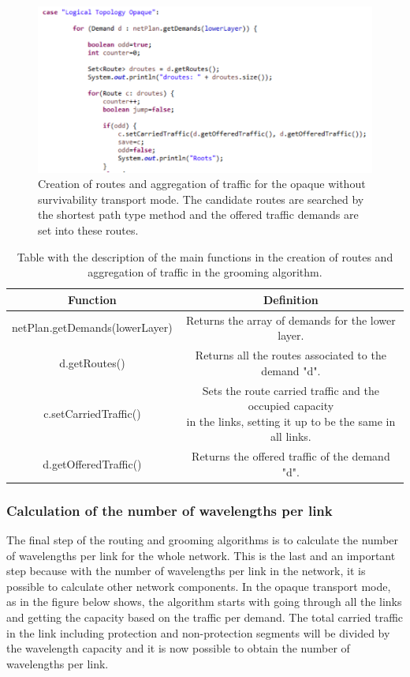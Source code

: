 \begin{figure}[H]
\centering
\includegraphics[width=14cm]{sdf/heuristic/opaque/figures/grooming_opaque_surv1}
\caption{Creation of routes and aggregation of traffic for the opaque without survivability transport mode. The candidate routes are searched by the shortest path type method and the offered traffic demands are set into these routes.}
\label{grooming_opaque_surv1}
\end{figure}

\begin{table}[H]
\centering
\begin{tabular}{|| c | c ||}
 \hline
 Function & Definition \\
 \hline\hline
 netPlan.getDemands(lowerLayer) & Returns the array of demands for the lower layer. \\
 \hline
 d.getRoutes() & Returns all the routes associated to the demand "d". \\
 \hline
 c.setCarriedTraffic() & \makecell{Sets the route carried traffic and the occupied capacity\\in the links, setting it up to be the same in all links.} \\
 \hline
 d.getOfferedTraffic() & Returns the offered traffic of the demand "d". \\
 \hline
\end{tabular}
\caption{Table with the description of the main functions in the creation of routes and aggregation of traffic in the grooming algorithm.}
\label{grooming_table_variables_opaque_surv}
\end{table}

\subsubsection{Calculation of the number of wavelengths per link}

\vspace{11pt}
The final step of the routing and grooming algorithms is to calculate the number of wavelengths per link for the whole network. This is the last and an important step because with the number of wavelengths per link in the network, it is possible to calculate other network components. In the opaque transport mode, as in the figure below shows, the algorithm starts with going through all the links and getting the capacity based on the traffic per demand. The total carried traffic in the link including protection and non-protection segments will be divided by the wavelength capacity and it is now possible to obtain the number of wavelengths per link.

